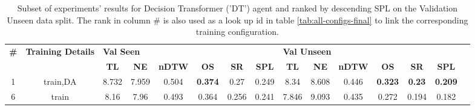 \begin{table}
\centering
\caption{\label{tab:dt_final}Subset of experiments' results for Decision Transformer ('DT') agent and ranked by descending SPL on the Validation Unseen data split. The rank in column \# is also used as a look up id in table \ref{tab:all-configs-final} to link the corresponding training configuration.}
\begin{tabular}{@{\hskip3pt}c@{\hskip3pt}c@{\hskip3pt}c@{\hskip3pt}c@{\hskip3pt}c@{\hskip3pt}c@{\hskip3pt}c@{\hskip3pt}c@{\hskip3pt}c@{\hskip3pt}c@{\hskip3pt}c@{\hskip3pt}c@{\hskip3pt}c@{\hskip3pt}c@{\hskip3pt}c}
\toprule
\textbf{\#} & \textbf{Training Details} & \multicolumn{6}{l}{\textbf{Val Seen}} & \multicolumn{6}{l}{\textbf{Val Unseen}} \\
 \textbf{~} &                \textbf{~} &       \textbf{TL} & \textbf{NE} & \textbf{nDTW} &     \textbf{OS} & \textbf{SR} & \textbf{SPL} &         \textbf{TL} & \textbf{NE} & \textbf{nDTW} &     \textbf{OS} &    \textbf{SR} &    \textbf{SPL} \\
\midrule
          1 &                  train,DA &             8.732 &       7.959 &         0.504 &  \textbf{0.374} &        0.27 &        0.249 &                8.34 &       8.608 &         0.446 &  \textbf{0.323} &  \textbf{0.23} &  \textbf{0.209} \\
          6 &                     train &              8.16 &        7.96 &         0.493 &           0.364 &       0.256 &        0.241 &               7.846 &       9.093 &         0.435 &           0.272 &          0.194 &           0.182 \\
\bottomrule
\end{tabular}
\end{table}
